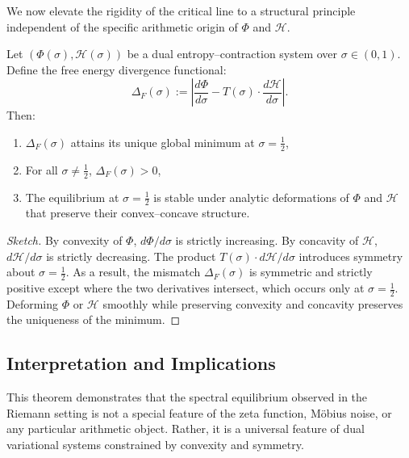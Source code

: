 \documentclass[12pt]{article}
\begin{document}
We now elevate the rigidity of the critical line to a structural principle independent of the specific arithmetic origin of $\Phi$ and $\mathcal{H}$.

\begin{theorem}
\label{thm:meta}
Let $(\Phi(\sigma), \mathcal{H}(\sigma))$ be a dual entropy–contraction system over $\sigma \in (0,1)$. Define the free energy divergence functional:
\[
\Delta_F(\sigma) := \left| \frac{d\Phi}{d\sigma} - T(\sigma) \cdot \frac{d\mathcal{H}}{d\sigma} \right|.
\]
Then:
\begin{enumerate}
    \item $\Delta_F(\sigma)$ attains its unique global minimum at $\sigma = \tfrac{1}{2}$,
    \item For all $\sigma \ne \tfrac{1}{2}$, $\Delta_F(\sigma) > 0$,
    \item The equilibrium at $\sigma = \tfrac{1}{2}$ is stable under analytic deformations of $\Phi$ and $\mathcal{H}$ that preserve their convex–concave structure.
\end{enumerate}
\end{theorem}

\begin{proof}[Sketch]
By convexity of $\Phi$, $d\Phi/d\sigma$ is strictly increasing. By concavity of $\mathcal{H}$, $d\mathcal{H}/d\sigma$ is strictly decreasing. The product $T(\sigma) \cdot d\mathcal{H}/d\sigma$ introduces symmetry about $\sigma = \tfrac{1}{2}$. As a result, the mismatch $\Delta_F(\sigma)$ is symmetric and strictly positive except where the two derivatives intersect, which occurs only at $\sigma = \tfrac{1}{2}$. Deforming $\Phi$ or $\mathcal{H}$ smoothly while preserving convexity and concavity preserves the uniqueness of the minimum.
\end{proof}

\subsection*{Interpretation and Implications}

This theorem demonstrates that the spectral equilibrium observed in the Riemann setting is not a special feature of the zeta function, Möbius noise, or any particular arithmetic object. Rather, it is a universal feature of dual variational systems constrained by convexity and symmetry.
\end{document}
